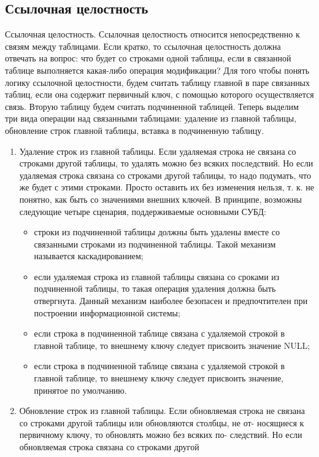 \subsection{Ссылочная целостность} 
Ссылочная целостность. Ссылочная целостность относится непосредственно к связям между таблицами. Если кратко, то ссылочная целостность
должна отвечать на вопрос: что будет со строками одной таблицы, если в
связанной таблице выполняется какая-либо операция модификации? Для
того чтобы понять логику ссылочной целостности, будем считать таблицу
главной в паре связанных таблиц, если она содержит первичный ключ, с
помощью которого осуществляется связь. Вторую таблицу будем считать
подчиненной таблицей. Теперь выделим три вида операции над связанными таблицами: удаление из главной таблицы, обновление строк главной
таблицы, вставка в подчиненную таблицу.
\begin{enumerate}
\item Удаление строк из главной таблицы. Если удаляемая строка не связана
со строками другой таблицы, то удалять можно без всяких последствий. Но если удаляемая строка связана со строками другой таблицы, то
надо подумать, что же будет с этими строками. Просто оставить их без
изменения нельзя, т. к. не понятно, как быть со значениями внешних
ключей. В принципе, возможны следующие четыре сценария, поддерживаемые основными СУБД:
\begin{itemize}
\item строки из подчиненной таблицы должны быть удалены вместе со
связанными строками из подчиненной таблицы. Такой механизм называется каскадированием;
\item если удаляемая строка из главной таблицы связана со сроками из
подчиненной таблицы, то такая операция удаления должна быть отвергнута. Данный механизм наиболее безопасен и предпочтителен
при построении информационной системы;
\item если строка в подчиненной таблице связана с удаляемой строкой в
главной таблице, то внешнему ключу следует присвоить значение
NULL;
\item если строка в подчиненной таблице связана с удаляемой строкой в
главной таблице, то внешнему ключу следует присвоить значение,
принятое по умолчанию.
\end{itemize}
\item Обновление строк из главной таблицы. Если обновляемая строка не
связана со строками другой таблицы или обновляются столбцы, не от-
носящиеся к первичному ключу, то обновлять можно без всяких по-
следствий. Но если обновляемая строка связана со строками другой

\end{enumerate}
